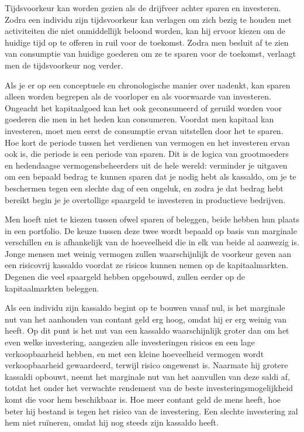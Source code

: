Tijdsvoorkeur kan worden gezien als de drijfveer achter sparen en investeren. Zodra een individu zijn tijdsvoorkeur kan verlagen om zich bezig te houden met activiteiten die niet onmiddellijk beloond worden, kan hij ervoor kiezen om de huidige tijd op te offeren in ruil voor de toekomst. Zodra men besluit af te zien van consumptie van huidige goederen om ze te sparen voor de toekomst, verlaagt men de tijdsvoorkeur nog verder.

Als je er op een conceptuele en chronologische manier over nadenkt, kan sparen alleen worden begrepen als de voorloper en als voorwaarde van investeren. Ongeacht het kapitaalgoed kan het ook geconsumeerd of geruild worden voor goederen die men in het heden kan consumeren. Voordat men kapitaal kan investeren, moet men eerst de consumptie ervan uitstellen door het te sparen. Hoe kort de periode tussen het verdienen van vermogen en het investeren ervan ook is, die periode is een periode van sparen. Dit is de logica van grootmoeders en hedendaagse vermogensbeheerders uit de hele wereld: verminder je uitgaven om een bepaald bedrag te kunnen sparen dat je nodig hebt als kassaldo, om je te beschermen tegen een slechte dag of een ongeluk, en zodra je dat bedrag hebt bereikt begin je je overtollige spaargeld te investeren in productieve bedrijven.

Men hoeft niet te kiezen tussen ofwel sparen of beleggen, beide hebben hun plaats in een portfolio. De keuze tussen deze twee wordt bepaald op basis van marginale verschillen en is afhankelijk van de hoeveelheid die in elk van beide al aanwezig is. Jonge mensen met weinig vermogen zullen waarschijnlijk de voorkeur geven aan een risicovrij kassaldo voordat ze risico\textquotesingle s kunnen nemen op de kapitaalmarkten. Degenen die veel spaargeld hebben opgebouwd, zullen eerder op de kapitaalmarkten beleggen.

Als een individu zijn kassaldo begint op te bouwen vanaf nul, is het marginale nut van het aanhouden van contant geld erg hoog, omdat hij er erg weinig van heeft. Op dit punt is het nut van een kassaldo waarschijnlijk groter dan om het even welke investering, aangezien alle investeringen risico\textquotesingle s en een lage verkoopbaarheid hebben, en met een kleine hoeveelheid vermogen wordt verkoopbaarheid gewaardeerd, terwijl risico ongewenst is. Naarmate hij grotere kassaldi opbouwt, neemt het marginale nut van het aanvullen van deze saldi af, totdat het onder het verwachte rendement van de beste investeringsmogelijkheid komt die voor hem beschikbaar is. Hoe meer contant geld de mens heeft, hoe beter hij bestand is tegen het risico van de investering. Een slechte investering zal hem niet ruïneren, omdat hij nog steeds zijn kassaldo heeft.

